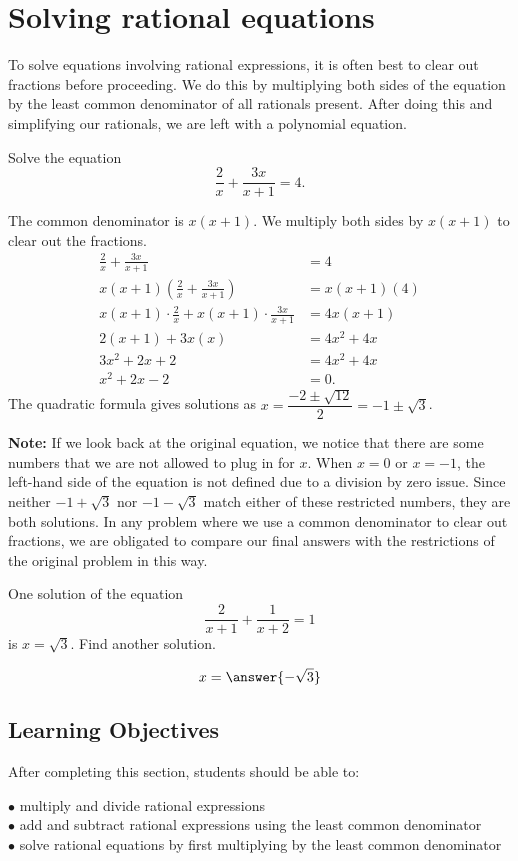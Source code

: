 \documentclass{ximera}
\begin{document}
\section{Solving rational equations}

To solve equations involving rational expressions, it is often best to clear out fractions before proceeding. We do this by multiplying both sides of the equation by the least common denominator of all rationals present. After doing this and simplifying our rationals, we are left with a polynomial equation.
\begin{example}
	Solve the equation
	\[  \frac{2}{x} + \frac{3x}{x+1} = 4.\]
	\begin{explanation}
		The common denominator is $x(x+1)$.  We multiply both sides by $x(x+1)$ to clear out the fractions.
		\begin{align*}
			\frac{2}{x} + \frac{3x}{x+1} &= 4	\\
			x(x+1) \left( \frac{2}{x} + \frac{3x}{x+1} \right) &= x(x+1) ( 4 )\\
			x(x+1) \cdot \frac{2}{x}  + x(x+1) \cdot \frac{3x}{x+1} &= 4x(x+1)\\
			2(x+1) + 3x(x) &= 4x^2 + 4x\\
			3x^2 + 2x + 2 &= 4x^2 + 4x\\
			x^2 + 2x - 2 &= 0.
		\end{align*}
		The quadratic formula gives solutions as $\displaystyle x = \dfrac{-2 \pm \sqrt{12}}{2} = -1 \pm \sqrt{3}$.
		
		\textbf{Note:} If we look back at the original equation, we notice that there are some numbers that we are not allowed to plug in for $x$.  When $x=0$ or $x=-1$,
		the left-hand side of the equation is not defined due to a division by zero issue.  Since neither $-1 + \sqrt{3}$ nor $-1-\sqrt{3}$ match either of these restricted numbers,
		they are both solutions. In any problem where we use a common denominator to clear out fractions, we are obligated to compare our final answers with the restrictions of the original problem in this way.
	\end{explanation}
\end{example}

\begin{question}
	One solution of the equation \[ \dfrac{2}{x+1}+ \dfrac{1}{x+2} = 1 \] is $x = \sqrt{3}$.  Find another solution. 
	\begin{prompt}
		\[ x = \answer{-\sqrt{3}} \]
	\end{prompt}
\end{question}

\subsection{Learning Objectives}
After completing this section, students should be able to:
\vspace{.05in}

\noindent$\bullet$ multiply and divide rational expressions
\\$\bullet$ add and subtract rational expressions using the least common denominator
\\$\bullet$ solve rational equations by first multiplying by the least common denominator
\end{document}
